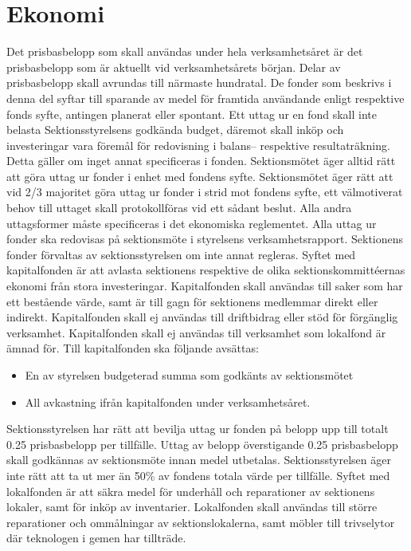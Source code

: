 \documentclass[a4paper]{dteklag}
\newcommand{\prisbasbelopp}[1]{
    #1 prisbasbelopp
    \ifdef{\nuvarandeprisbasbelopp}{
        \marginpar{
            \small{ \textbf{\roundandprint{\xintiexpr#1 * \nuvarandeprisbasbelopp\relax}kr}}
        }
    }{}
}
\begin{document}
\section{Ekonomi}
\para Det prisbasbelopp som skall användas under hela verksamhetsåret är det prisbasbelopp som är aktuellt vid verksamhetsårets början.
\para Delar av prisbasbelopp skall avrundas till närmaste hundratal.
\para De fonder som beskrivs i denna del syftar till sparande av medel för framtida användande enligt respektive fonds syfte, antingen planerat eller spontant. Ett uttag ur en fond skall inte belasta Sektionsstyrelsens godkända budget, däremot skall inköp och investeringar vara föremål för redovisning i balans– respektive resultaträkning. Detta gäller om inget annat specificeras i fonden.
\para Sektionsmötet äger alltid rätt att göra uttag ur fonder i enhet med fondens syfte. Sektionsmötet äger rätt att vid 2/3 majoritet göra uttag ur fonder i strid mot fondens syfte, ett välmotiverat behov till uttaget skall protokollföras vid ett sådant beslut. Alla andra uttagsformer måste specificeras i det ekonomiska reglementet.
\para Alla uttag ur fonder ska redovisas på sektionsmöte i styrelsens verksamhetsrapport.
\para Sektionens fonder förvaltas av sektionsstyrelsen om inte annat regleras.
\para[Kapitalfonden] Syftet med kapitalfonden är att avlasta sektionens respektive de olika sektionskommittéernas ekonomi från stora investeringar. 
\para Kapitalfonden skall användas till saker som har ett bestående värde, samt är till gagn för sektionens medlemmar direkt eller indirekt.
\para Kapitalfonden skall ej användas till driftbidrag eller stöd för förgänglig verksamhet.
\para Kapitalfonden skall ej användas till verksamhet som lokalfond är ämnad för.
\para Till kapitalfonden ska följande avsättas:
\begin{itemize}
\item En av styrelsen budgeterad summa som godkänts av sektionsmötet
\item All avkastning ifrån kapitalfonden under verksamhetsåret.
\end{itemize}
\para Sektionsstyrelsen har rätt att bevilja uttag ur fonden på belopp upp till totalt \prisbasbelopp{0.25} per tillfälle. Uttag av belopp överstigande \prisbasbelopp{0.25} skall godkännas av sektionsmöte innan medel utbetalas.
\para Sektionsstyrelsen äger inte rätt att ta ut mer än 50\% av fondens totala värde per tillfälle.
\para[Lokalfonden] Syftet med lokalfonden är att säkra medel för underhåll och reparationer av sektionens lokaler, samt för inköp av inventarier.
\para Lokalfonden skall användas till större reparationer och ommålningar av sektionslokalerna, samt möbler till trivselytor där teknologen i gemen har tillträde.
\end{document}
